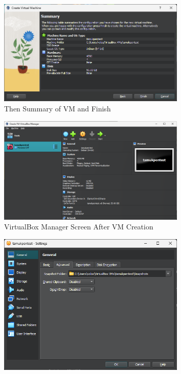 \documentclass[12pt]{article}
\newenvironment{problem}[2][Problem]{\begin{trivlist}
\item[\hskip \labelsep {\bfseries #1}\hskip \labelsep {\bfseries #2.}]}{\end{trivlist}}
\begin{document}
\begin{problem}{1}
    \begin{figure}[H]
        \centering
        \includegraphics[width=0.8\textwidth]{summary}
        \caption{Then Summary of VM and Finish}
    \end{figure}
    \begin{figure}[H]
        \centering
        \includegraphics[width=0.8\textwidth]{manager2}
        \caption{VirtualBox Manager Screen After VM Creation}
    \end{figure}
    \begin{figure}[H]
        \centering
        \includegraphics[width=0.8\textwidth]{general_advanced_settings}

\end{figure}
\end{problem}
\end{document}
